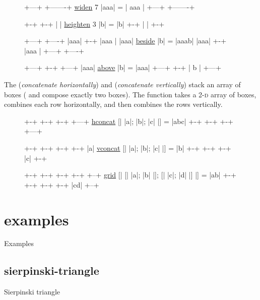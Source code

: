 \documentclass{article}
\begin{document}
\begin{figure}
\begin{code}
        +---+   +-------+
\href{#ref-widen}{widen} 7 |aaa| = |  aaa  |
        +---+   +-------+

                 +-+
           +-+   | |
\href{#ref-heighten}{heighten} 3 |b| = |b|
           +-+   | |
                 +-+

+---+              +----+
|aaa|        +-+   |aaa |
|aaa| \href{#ref-beside}{beside} |b| = |aaab|
|aaa|        +-+   |aaa |
+---+              +----+

+---+         +-+   +---+
|aaa|  \href{#ref-above}{above}  |b| = |aaa|
+---+         +-+   | b |
                    +---+
\end{code}
\end{figure}

The \href{#ref-hconcat}{} (\emph{concatenate horizontally}) and \href{#ref-vconcat}{} (\emph{concatenate vertically})
stack an array of boxes (\href{#ref-beside}{} and \href{#ref-above}{} compose exactly two boxes).
The \href{#ref-grid}{} function takes a \textsc{2-d} array of boxes,
combines each row horizontally,
and then combines the rows vertically.

\begin{figure}
\begin{code}
           +-+  +-+  +-+      +---+
\href{#ref-hconcat}{hconcat} [| |a|; |b|; |c| |] = |abc|
           +-+  +-+  +-+      +---+

                              +-+
           +-+  +-+  +-+      |a|
\href{#ref-vconcat}{vconcat} [| |a|; |b|; |c| |] = |b|
           +-+  +-+  +-+      |c|
                              +-+

           +-+  +-+        +-+  +-+         +--+
\href{#ref-grid}{grid} [| [| |a|; |b| |]; [| |c|; |d| |] |] = |ab|
           +-+  +-+        +-+  +-+         |cd|
                                            +--+
\end{code}
\end{figure}

\section{examples}{Examples}
\subsection{sierpinski-triangle}{Sierpinski triangle}
\end{document}
